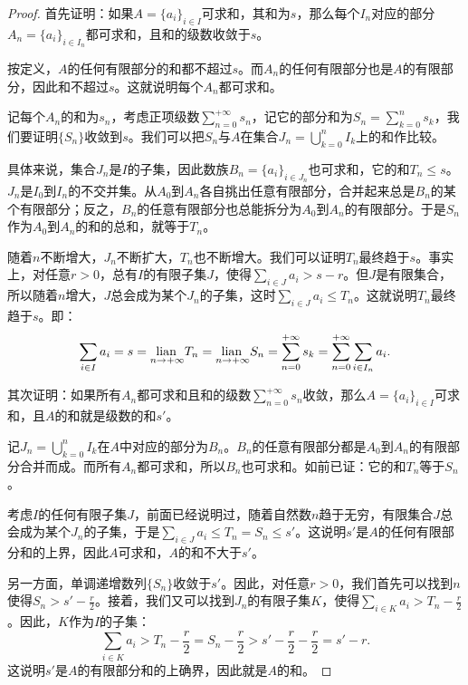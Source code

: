 \documentclass[12pt,UTF8,fontset=none]{ctexbook}
\begin{document}
\begin{proof}
    首先证明：如果$A = \{a_i\}_{i\in I}$可求和，其和为$s$，那么每个$I_n$对应的部分$A_n = \{a_i\}_{i\in I_n}$都可求和，且和的级数收敛于$s$。

    按定义，$A$的任何有限部分的和都不超过$s$。而$A_n$的任何有限部分也是$A$的有限部分，因此和不超过$s$。这就说明每个$A_n$都可求和。
    
    记每个$A_n$的和为$s_n$，考虑正项级数$ \sum_{n=0}^{+\infty} s_n$，记它的部分和为$S_n = \sum_{k=0}^{n} s_k$，我们要证明$\{S_n\}$收敛到$s$。我们可以把$S_n$与$A$在集合$J_n = \bigcup_{k=0}^n I_k$上的和作比较。

    具体来说，集合$J_n$是$I$的子集，因此数族$B_n = \{a_i\}_{i\in J_n}$也可求和，它的和$T_n\leqslant s$。$J_n$是$I_0$到$I_n$的不交并集。从$A_0$到$A_n$各自挑出任意有限部分，合并起来总是$B_n$的某个有限部分；反之，$B_n$的任意有限部分也总能拆分为$A_0$到$A_n$的有限部分。于是$S_n$作为$A_0$到$A_n$的和的总和，就等于$T_n$。
    
    随着$n$不断增大，$J_n$不断扩大，$T_n$也不断增大。我们可以证明$T_n$最终趋于$s$。事实上，对任意$r>0$，总有$I$的有限子集$J$，使得$\sum_{i\in J} a_i > s - r$。但$J$是有限集合，所以随着$n$增大，$J$总会成为某个$J_n$的子集，这时$\sum_{i\in J} a_i\leqslant T_n$。这就说明$T_n$最终趋于$s$。即：
    $$ \sum_{i\in I} a_i = s = \underset{n\to +\infty}{\operatorname{lian}\,} T_n = \underset{n\to +\infty}{\operatorname{lian}\,} S_n = \sum_{n=0}^{+\infty} s_k = \sum_{n=0}^{+\infty} \sum_{i\in I_n} a_i. $$

    其次证明：如果所有$A_n$都可求和且和的级数$\sum_{n=0}^{+\infty} s_n$收敛，那么$A = \{a_i\}_{i\in I}$可求和，且$A$的和就是级数的和$s'$。

    记$J_n = \bigcup_{k=0}^n I_k$在$A$中对应的部分为$B_n$。$B_n$的任意有限部分都是$A_0$到$A_n$的有限部分合并而成。而所有$A_n$都可求和，所以$B_n$也可求和。如前已证：它的和$T_n$等于$S_n$。

    考虑$I$的任何有限子集$J$，前面已经说明过，随着自然数$n$趋于无穷，有限集合$J$总会成为某个$J_n$的子集，于是$\sum_{i\in J} a_i\leqslant T_n = S_n \leqslant s'$。这说明$s'$是$A$的任何有限部分和的上界，因此$A$可求和，$A$的和不大于$s'$。

    另一方面，单调递增数列$\{S_n\}$收敛于$s'$。因此，对任意$r>0$，我们首先可以找到$n$使得$S_n > s' - \frac{r}{2}$。接着，我们又可以找到$J_n$的有限子集$K$，使得$\sum_{i\in K} a_i > T_n - \frac{r}{2}$。因此，$K$作为$I$的子集：
    $$\sum_{i\in K} a_i > T_n - \frac{r}{2} = S_n - \frac{r}{2} > s' - \frac{r}{2} - \frac{r}{2} = s' - r. $$
    这说明$s'$是$A$的有限部分和的上确界，因此就是$A$的和。

\end{proof}
\end{document}
